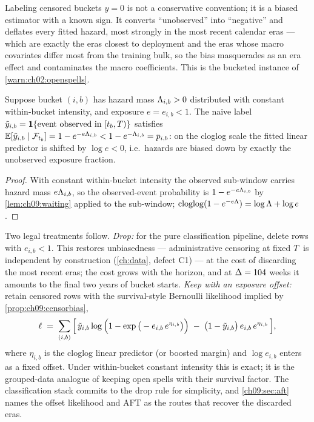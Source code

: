 \begin{warning}\label{warn:ch09:censorzero}
Labeling censored buckets $y=0$ is not a conservative convention; it is a
biased estimator with a known sign. It converts ``unobserved'' into
``negative'' and deflates every fitted hazard, most strongly in the most
recent calendar eras --- which are exactly the eras closest to deployment
and the eras whose macro covariates differ most from the training bulk,
so the bias masquerades as an era effect and contaminates the macro
coefficients. This is the bucketed instance of
\cref{warn:ch02:openspells}.
\end{warning}

\begin{proposition}\label{prop:ch09:censorbias}
Suppose bucket $(i,b)$ has hazard mass $\Lambda_{i,b} > 0$ distributed with
constant within-bucket intensity, and exposure $e = e_{i,b} < 1$. The
naive label $\tilde y_{i,b} = \mathbf{1}\{\text{event observed in }
[t_b, T)\}$ satisfies
$\mathbb{E}[\tilde y_{i,b} \mid \mathcal{F}_{t_b}] = 1 - e^{-e \Lambda_{i,b}}
< 1 - e^{-\Lambda_{i,b}} = p_{i,b}$:
on the cloglog scale the fitted linear predictor is shifted by
$\log e < 0$, i.e.\ hazards are biased down by exactly the unobserved
exposure fraction.
\end{proposition}

\begin{proof}
With constant within-bucket intensity the observed sub-window carries
hazard mass $e\Lambda_{i,b}$, so the observed-event probability is
$1 - e^{-e\Lambda_{i,b}}$ by \cref{lem:ch09:waiting} applied to the
sub-window; $\operatorname{cloglog}(1 - e^{-e\Lambda}) = \log \Lambda + \log e$.
\end{proof}

Two legal treatments follow. \emph{Drop:} for the pure classification
pipeline, delete rows with $e_{i,b} < 1$. This restores unbiasedness ---
administrative censoring at fixed $T$ is independent by construction
(\cref{ch:data}, defect C1) --- at the cost of discarding the most recent
eras; the cost grows with the horizon, and at $\Delta = 104$ weeks it
amounts to the final two years of bucket starts. \emph{Keep with an
exposure offset:} retain censored rows with the survival-style Bernoulli
likelihood implied by \cref{prop:ch09:censorbias},
\begin{equation}\label{eq:ch09:offsetlik}
\ell \;=\; \sum_{(i,b)} \Big[\, \tilde y_{i,b} \log\Big(1 -
\exp\big(-e_{i,b}\, e^{\eta_{i,b}}\big)\Big) \;-\; \big(1 -
\tilde y_{i,b}\big)\, e_{i,b}\, e^{\eta_{i,b}} \,\Big],
\end{equation}
where $\eta_{i,b}$ is the cloglog linear predictor (or boosted margin)
and $\log e_{i,b}$ enters as a fixed offset. Under within-bucket constant
intensity this is exact; it is the grouped-data analogue of keeping open
spells with their survival factor. The classification stack commits to
the drop rule for simplicity, and \cref{ch09:sec:aft} names the offset
likelihood and AFT as the routes that recover the discarded eras.

